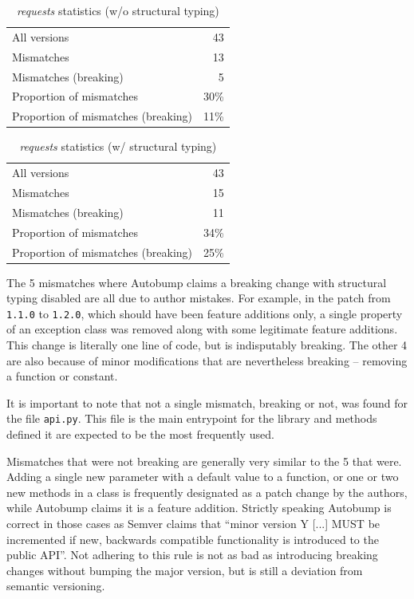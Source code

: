 \documentclass{l4proj}
\newcommand\genericstyle{\lstset{basicstyle=\ttm}}
\newcommand\codeinline[1]{{\genericstyle\lstinline!#1!}}
\begin{document}
\noindent
\begin{minipage}[t]{0.5\textwidth}
\begin{table}[H]
\centering
\begin{tabular}{|lr|}
All versions & 43 \\
Mismatches & 13 \\
Mismatches (breaking) & 5 \\
Proportion of mismatches & 30\% \\
Proportion of mismatches (breaking) & 11\%
\end{tabular}
\caption{\textit{requests} statistics (w/o structural typing)}
\label{RequestsNonStructural}
\end{table}
\end{minipage}
\begin{minipage}[t]{0.5\textwidth}
\begin{table}[H]
\centering
\begin{tabular}{|lr|}
All versions & 43 \\
Mismatches & 15 \\
Mismatches (breaking) & 11 \\
Proportion of mismatches & 34\% \\
Proportion of mismatches (breaking) & 25\%
\end{tabular}
\caption{\textit{requests} statistics (w/ structural typing)}
\label{RequestsStructural}
\end{table}
\end{minipage}

The 5 mismatches where Autobump claims a breaking change with
structural typing disabled are all due to author mistakes. For
example, in the patch from \codeinline{1.1.0} to \codeinline{1.2.0},
which should have been feature additions only, a single property of an
exception class was removed along with some legitimate feature
additions. This change is literally one line of code, but is
indisputably breaking. The other 4 are also because of minor
modifications that are nevertheless breaking -- removing a function or constant.

It is important to note that not a single mismatch, breaking or not,
was found for the file \codeinline{api.py}. This file is the main
entrypoint for the library and methods defined it are expected to be
the most frequently used.

Mismatches that were not breaking are generally very similar to the 5
that were. Adding a single new parameter with a default value to a
function, or one or two new methods in a class is frequently
designated as a patch change by the authors, while Autobump claims it
is a feature addition. Strictly speaking Autobump is correct in those
cases as Semver claims that ``minor version Y [...] MUST be
incremented if new, backwards compatible functionality is introduced
to the public API''. Not adhering to this rule is not as bad as
introducing breaking changes without bumping the major version, but is
still a deviation from semantic versioning.
\end{document}
